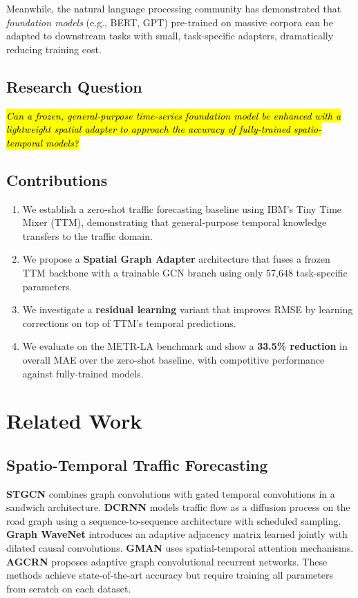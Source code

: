 \documentclass[11pt, a4paper]{article}
\begin{document}
Meanwhile, the natural language processing community has demonstrated that \textit{foundation models} (e.g., BERT, GPT) pre-trained on massive corpora can be adapted to downstream tasks with small, task-specific adapters, dramatically reducing training cost.

\subsection{Research Question}
\hl{\textit{Can a frozen, general-purpose time-series foundation model be enhanced with a lightweight spatial adapter to approach the accuracy of fully-trained spatio-temporal models?}}

\subsection{Contributions}
\begin{enumerate}[nosep]
    \item We establish a zero-shot traffic forecasting baseline using IBM's Tiny Time Mixer (TTM), demonstrating that general-purpose temporal knowledge transfers to the traffic domain.
    \item We propose a \textbf{Spatial Graph Adapter} architecture that fuses a frozen TTM backbone with a trainable GCN branch using only 57,648 task-specific parameters.
    \item We investigate a \textbf{residual learning} variant that improves RMSE by learning corrections on top of TTM's temporal predictions.
    \item We evaluate on the METR-LA benchmark and show a \textbf{33.5\% reduction} in overall MAE over the zero-shot baseline, with competitive performance against fully-trained models.
\end{enumerate}

\section{Related Work}
\label{sec:related}

\subsection{Spatio-Temporal Traffic Forecasting}

\textbf{STGCN} combines graph convolutions with gated temporal convolutions in a sandwich architecture. \textbf{DCRNN} models traffic flow as a diffusion process on the road graph using a sequence-to-sequence architecture with scheduled sampling. \textbf{Graph WaveNet} introduces an adaptive adjacency matrix learned jointly with dilated causal convolutions. \textbf{GMAN} uses spatial-temporal attention mechanisms. \textbf{AGCRN} proposes adaptive graph convolutional recurrent networks. These methods achieve state-of-the-art accuracy but require training all parameters from scratch on each dataset.
\end{document}
